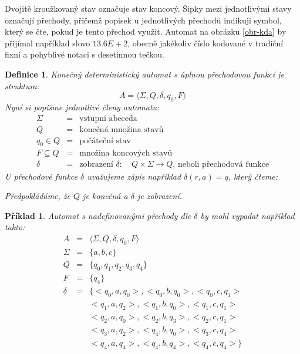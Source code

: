 \documentclass[10pt, a4paper, titlepage]{article}
\theoremstyle{note}
\newtheorem{definice}{Definice}
\newtheorem{priklad}{Příklad}
\begin{document}
Dvojitě kroužkovaný stav označuje stav koncový. Šipky mezi jednotlivými stavy označují přechody, přičemž popisek u jednotlivých přechodů
indikuji symbol, který se čte, pokud je tento přechod využit. Automat na obrázku \ref{obr-kda} by přijímal například slovo $13.6E+2$, obecně
jakékoliv číslo kodované v tradiční fixní a pohyblivé notaci s desetinnou tečkou.

\begin{definice}
Konečný deterministický automat s úplnou přechodovou funkcí je struktura:
$$
A = \langle \Sigma, Q, \delta, q_0, F \rangle
$$
Nyní si popišme jednotlivé členy automatu:
\begin{eqnarray*}
\Sigma &=& \text{vstupní abeceda} \\
Q &=& \text{konečná množina stavů} \\
q_0 \in Q &=& \text{počáteční stav} \\
F \subseteq Q &=& \text{množina koncových stavů} \\
\delta &=& \text{zobrazení } \delta:\quad Q \times \Sigma \rightarrow Q \text{, neboli přechodová funkce}
\end{eqnarray*}
U přechodové funkce $\delta$ uvažujeme zápis například $\delta(r, a) = q$, který čteme: 

Předpokládáme, že $Q$ je konečná a $\delta$ je zobrazení.
\end{definice}

\begin{priklad}
Automat s nadefinovanými přechody dle $\delta$ by mohl vypadat například takto:
\begin{eqnarray*}
A &=& \langle \Sigma, Q, \delta, q_0, F \rangle \\
\Sigma &=& \lbrace a, b, c \rbrace \\
Q &=& \lbrace q_0, q_1, q_2, q_3, q_4 \rbrace \\
F &=& \lbrace q_4 \rbrace \\
\delta &=& \lbrace <q_0, a, q_0>, <q_0, b, q_0>, <q_0, c, q_1> \\
& & <q_1, a, q_2>, <q_1, b, q_0>, <q_1, c, q_1> \\
& & <q_2, a, q_0>, <q_2, b, q_3>, <q_2, c, q_1> \\
& & <q_3, a, q_2>, <q_4, b, q_0>, <q_3, c, q_4> \\
& & <q_4, a, q_4>, <q_4, b, q_4>, <q_4, c, q_4> \rbrace
\end{eqnarray*}
\end{priklad}
\end{document}
